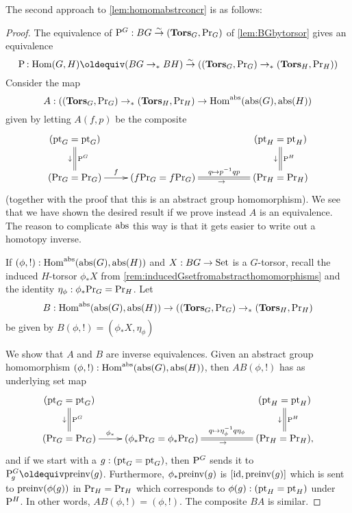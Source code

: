 \label{sec:absconctorsor}

The second approach to \cref{lem:homomabstrconcr} is as follows:


\begin{proof}
  The equivalence of $\mathrm{P}_{\!}^G:BG\overset\sim\to(\mathbf{Tors}_G,\mathrm{Pr}_{{G}})$ of \cref{lem:BGbytorsor} gives an equivalence
$$\pathsp{}:\Hom(G,H)\oldequiv (BG\to_*BH)\we((\typetorsor_G,\princ G)\to_*(\typetorsor_H,\princ H))
$$
Consider the map
$$A:((\mathbf{Tors}_G,\mathrm{Pr}_{{G}})\to_*(\mathbf{Tors}_H,\mathrm{Pr}_{{H}})\to \mathrm{Hom}^{\mathrm{abs}}(\mathrm{abs}(G),\mathrm{abs}(H))$$
given by letting $A(f,p)$ be the composite 
$$\xymatrix{(\pt_G=\pt_G)\ar@{=}[d]^{\pathsp{}^G}_\downarrow&&&
  (\pt_H=\pt_H)\ar@{=}[d]^{\pathsp{}^H}_\downarrow\\
  (\princ G=\princ G)\ar[r]^-f&
  (f\princ G=f\princ G)\ar@{=}[rr]^-{q\mapsto p^{-1}qp}_\to&&
  (\princ H=\princ H)
}$$
(together with the proof that this is an abstract group homomorphism).  We see that we have shown the desired result if we prove instead $A$ is an equivalence.  The reason to complicate $\mathrm{abs}$ this way is that it gets easier to write out a homotopy inverse.

If $(\phi,!):\mathrm{Hom}^{\mathrm{abs}}(\mathrm{abs}(G),\mathrm{abs}(H))$ and $X:BG\to\mathord{\mathrm{Set}}$ is a $G$-torsor, recall the induced $H$-torsor $\phi_*X$ from \cref{rem:inducedGsetfromabstracthomomorphisms} and the identity $\eta_\phi:\phi_*\mathrm{Pr}_{{G}}=\mathrm{Pr}_{{H}}$. 
Let 
$$B: \mathrm{Hom}^{\mathrm{abs}}(\mathrm{abs}(G),\mathrm{abs}(H))\to ((\mathbf{Tors}_G,\mathrm{Pr}_{{G}})\to_*(\mathbf{Tors}_H,\mathrm{Pr}_{{H}})$$
be given by $B(\phi,!)=(\phi_*X,\eta_\phi)$

We show that $A$ and $B$ are inverse equivalences.  Given an abstract group homomorphism $(\phi,!):\mathrm{Hom}^{\mathrm{abs}}(\mathrm{abs}(G),\mathrm{abs}(H))$, then $AB(\phi,!)$ has as underlying set map
$$\xymatrix{(\pt_G=\pt_G)\ar@{=}[d]^{\pathsp{}^G}_\downarrow&&&
  (\pt_H=\pt_H)\ar@{=}[d]^{\pathsp{}^H}_\downarrow\\
  (\princ G=\princ G)\ar[r]^-{\phi_*}&
  (\phi_*\princ G=\phi_*\princ G)\ar@{=}[rr]^-{q\mapsto \eta_\phi^{-1}q\eta_\phi}_\to&&
  (\princ H=\princ H),
}$$
and if we start with a $g:(\mathrm{pt}_G=\mathrm{pt}_G)$, then $\mathrm{P}_{\!}^G$ sends it to $\pathsp g^G\oldequiv\preinv (g)$.  Furthermore, $\phi_*\mathrm{preinv} (g)$ is $[\mathord{\mathrm{id}},\mathrm{preinv} (g)]$ which is sent to $\mathrm{preinv} (\phi(g))$ in $\mathrm{Pr}_{{H}}=\mathrm{Pr}_{{H}}$ which corresponds to $\phi(g):(\mathrm{pt}_H=\mathrm{pt}_H)$ under $\mathrm{P}_{\!}^H$.  In other words, $AB(\phi,!)=(\phi,!)$.  The composite $BA$ is similar.
\end{proof}

